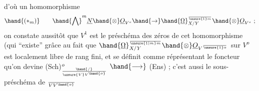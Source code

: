 d'où  un homomorphisme
\[ \hand{(*_m)} \qquad \hand{\bigwedge}^m\underline{N}\hand{\otimes}\underline{O}_{V^o}\hand{\to}\hand{\underline{\Omega}}^{\over{\unsure{1}}{m}}_{X/Y}\hand{\otimes}\underline{O}_{V^o}\ ; \]
on constate aussitôt que $V^1$ est le préschéma des zéros de cet homomorphisme
(qui ``existe'' grâce au fait que $\hand{\underline{\Omega}}^{\over{\unsure{1|m}}{m}}_{X/Y}\hand{\otimes}\underline{O}_{V^{\over{\unsure{1}}{o}}}$  sur  $V^o$ est localement libre
de rang fini, et se définit comme réprésentant le foncteur qu'on devine
(Sch)$^o_{\hand{/}\over{\unsure{V}}{V}^{\hand{o}}}$ $\hand{\longrightarrow}$ (Ens) ; c'est aussi le sous-préschéma de $\over{V}{V}^{\hand{o}}$

